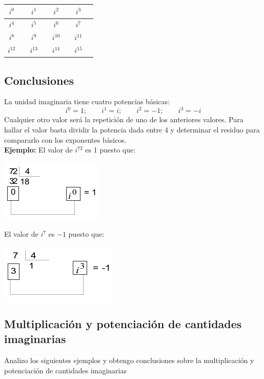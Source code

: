 \documentclass[letterpaper,11pt,twoside]{article}
\begin{document}
\begin{multicols}{2}
\begin{enumerate}
  \begin{tabular}{|c|p{0.5cm}|c|p{0.5cm}|c|p{0.5cm}|c|p{0.5cm}|}
  \hline $ i^0 $ & & $ i^1 $ & & $ i^2 $ & & $ i^3 $ &\\
  \hline $ i^4 $ & & $ i^5 $ & & $ i^6 $ & & $ i^7 $ &\\
  \hline $ i^8 $ & & $ i^9 $ & & $ i^{10} $ & & $ i^{11} $ &\\
  \hline $ i^{12} $ & & $ i^{13} $ & & $ i^{14} $ & & $ i^{15} $ & \\ \hline
  \end{tabular}
    \end{enumerate}
  \subsection*{Conclusiones}
  La unidad imaginaria tiene cuatro potencias básicas:
  \[ i^0=1; \qquad i^1=i;\qquad i^2=-1;\qquad i^3=-i \]
  Cualquier otro valor será la repetición de uno de los anteriores valores. Para hallar el valor basta dividir la potencia dada entre 4 y determinar el residuo para compararlo con los exponentes básicos.\\
  
  \textbf{Ejemplo:} El valor de $ i^{72} $ es 1 puesto que: 
  \begin{center}
  \includegraphics[scale=.5]{Images/div.png}
  \end{center}
  El valor de $ i^7 $ es $ -1 $ puesto que:
  \begin{center}
  \includegraphics[scale=.5]{Images/div2.png}
  \end{center}
  \subsection*{Multiplicación y potenciación de cantidades imaginarias}
  Analizo los siguientes ejemplos y obtengo conclusiones sobre la multiplicación y potenciación de cantidades imaginarias\\
  

\end{multicols}
\end{document}
